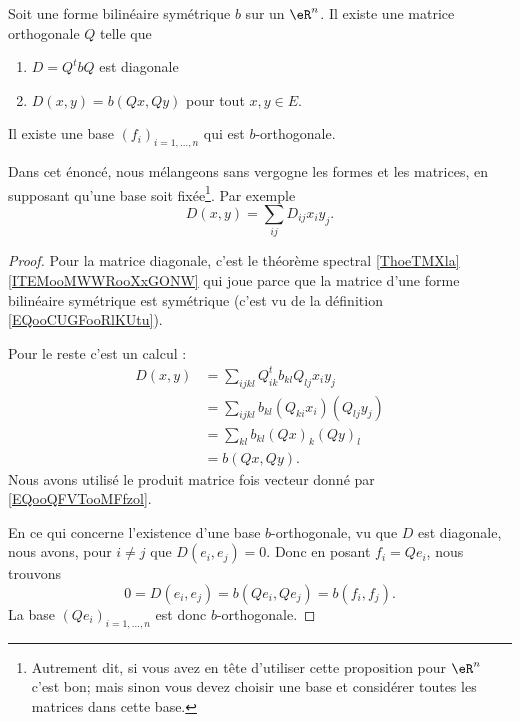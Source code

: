 \begin{proposition}     \label{PROPooUKRUooGRIDHt}
    Soit une forme bilinéaire symétrique \( b\) sur un \( \eR^n\). Il existe une matrice orthogonale \( Q\) telle que 
    \begin{enumerate}
        \item
            \( D=Q^tbQ\) est diagonale
        \item
            \( D(x,y)=b(Qx,Qy)\) pour tout \( x,y\in E\).
    \end{enumerate}

    Il existe une base \( (f_i)_{i=1,\ldots, n}\) qui est \( b\)-orthogonale.

    Dans cet énoncé, nous mélangeons sans vergogne les formes et les matrices, en supposant qu'une base soit fixée\footnote{Autrement dit, si vous avez en tête d'utiliser cette proposition pour \( \eR^n\) c'est bon; mais sinon vous devez choisir une base et considérer toutes les matrices dans cette base.}. Par exemple
    \begin{equation}
        D(x,y)=\sum_{ij}D_{ij}x_iy_j.
    \end{equation}
\end{proposition}

\begin{proof}
    Pour la matrice diagonale, c'est le théorème spectral \ref{ThoeTMXla}\ref{ITEMooMWWRooXxGONW} qui joue parce que la matrice d'une forme bilinéaire symétrique est symétrique (c'est vu de la définition \eqref{EQooCUGFooRlKUtu}).

    Pour le reste c'est un calcul :
    \begin{subequations}
        \begin{align}
            D(x,y)&=\sum_{ijkl}Q^t_{ik}b_{kl}Q_{lj}x_iy_j\\
            &=\sum_{ijkl}b_{kl}(Q_{ki}x_i)(Q_{lj}y_j)\\
            &=\sum_{kl}b_{kl}(Qx)_k(Qy)_l\\
            &=b(Qx,Qy).
        \end{align}
    \end{subequations}
    Nous avons utilisé le produit matrice fois vecteur donné par \eqref{EQooQFVTooMFfzol}.

    En ce qui concerne l'existence d'une base \( b\)-orthogonale, vu que \( D\) est diagonale, nous avons, pour \( i\neq j\) que \( D(e_i,e_j)=0\). Donc en posant \( f_i=Qe_i\), nous trouvons
    \begin{equation}
        0=D(e_i,e_j)=b(Qe_i,Qe_j)=b(f_i,f_j).
    \end{equation}
    La base \( (Qe_i)_{i=1,\ldots, n}\) est donc \( b\)-orthogonale.
\end{proof}

